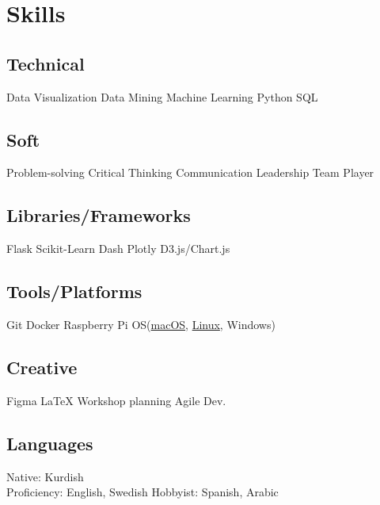 \documentclass[a4paper]{plushcv}
\begin{document}
\begin{minipage}[t]{0.28\textwidth}
\sectionsep



\section{Skills}
\subsection{Technical}
\sectionsep

Data Visualization \textbullet{} Data Mining  Machine Learning \textbullet{} Python \textbullet{} SQL

\sectionsep
\sectionsep
\subsection{Soft}
\sectionsep

Problem-solving \textbullet{} Critical Thinking \textbullet{} Communication \textbullet{} Leadership \textbullet{} Team Player
\sectionsep
\sectionsep

\subsection{Libraries/Frameworks}
\sectionsep
Flask \textbullet{} Scikit-Learn \textbullet{} Dash Plotly \textbullet{} D3.js/Chart.js \\
\sectionsep
\sectionsep

\subsection{Tools/Platforms}
\sectionsep
Git \textbullet{} Docker \textbullet{} Raspberry Pi \textbullet{} OS(\underline{macOS}, \underline{Linux}, Windows) \\

\sectionsep
\sectionsep
\subsection{Creative}
\sectionsep
Figma \textbullet{} \LaTeX \textbullet{} Workshop planning  \textbullet{} Agile Dev.

\sectionsep
\sectionsep
\subsection{Languages}
\sectionsep
Native: Kurdish \textbullet{} \\ Proficiency: English, Swedish \textbullet{} Hobbyist: Spanish, Arabic \\
\sectionsep


\end{minipage}
\end{document}
